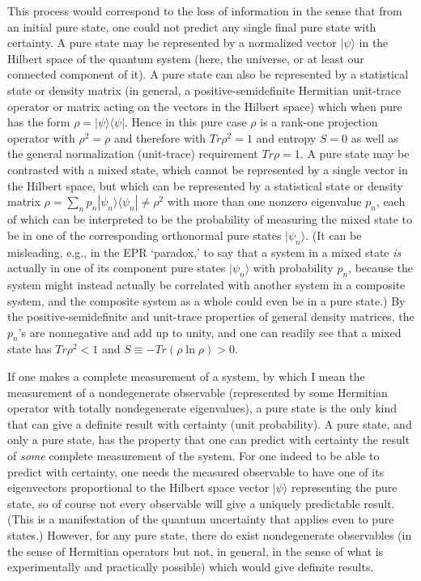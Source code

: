      This process would correspond to the loss of information in the
sense that
from an initial pure state, one could not predict any single final
pure state
with certainty.  A pure state may be represented by a normalized
vector
$|\psi\rangle$ in the Hilbert space of the quantum system (here, the
universe,
or at least our connected component of it).  A pure state can also be
represented by a statistical state or density matrix (in general, a
positive-semidefinite Hermitian unit-trace operator or matrix acting
on the
vectors in the Hilbert space) which when pure has the form
$\rho=|\psi\rangle\langle\psi|$.  Hence in this pure case $\rho$ is a
rank-one
projection operator with $\rho^2=\rho$ and therefore with
$Tr\rho^2=1$
and entropy $S=0$ as well as the general normalization (unit-trace)
requirement $Tr\rho=1$.
A pure state may be contrasted with a mixed state, which cannot be
represented
by a single vector in the Hilbert space, but which can be represented
by a
statistical state or density matrix $\rho=\sum_n p_n
|\psi_n\rangle\langle\psi_n| \neq \rho^2$ with more than one nonzero
eigenvalue
$p_n$, each of which can be interpreted to be the probability of
measuring the
mixed state to be in one of the corresponding orthonormal pure states
 $|\psi_n\rangle$.  (It can be misleading, e.g., in the EPR
`paradox,'
 to say that a system in a mixed state
{\it is} actually in one of its component pure states
$|\psi_n\rangle$ with
probability $p_n$, because the system might instead actually be
correlated with
another system in a composite system, and the composite system as a
whole could
even be in a pure state.)  By the positive-semidefinite and
unit-trace
properties of general density matrices, the $p_n$'s are nonnegative
and add up
to unity, and one can readily see that a mixed state has $Tr\rho^2 <
1$ and
$S\equiv -Tr(\rho\ln\rho)>0$.

     If one makes a complete measurement of a system, by which I mean
the
measurement of a nondegenerate observable (represented by some
Hermitian
operator with totally nondegenerate eigenvalues), a pure state is the
only kind
that can give a definite result with certainty (unit probability).  A
pure
state, and only a pure state, has the property that one can predict
with
certainty the result of {\it some} complete measurement of the
system.  For one
indeed to be able to predict with certainty, one needs the measured
observable
to have one of its eigenvectors proportional to the Hilbert space
vector
$|\psi\rangle$ representing the pure state, so of course not every
observable
will give a uniquely predictable result.  (This is a manifestation of
the
quantum uncertainty that applies even to pure states.)  However, for
any pure
state, there do exist nondegenerate observables (in the sense of
Hermitian
operators but not, in general, in the sense of what is experimentally
and
practically possible) which would give definite results.

